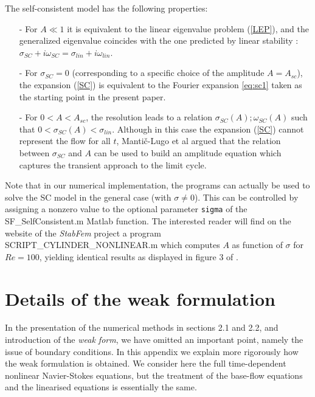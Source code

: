 \documentclass[twocolumn,10pt]{asme2ej}
\begin{document}
The self-consistent model has the following properties:
\begin{itemize}
\item[-] For $ A \ll 1$ it is equivalent to the linear eigenvalue problem (\ref{LEP}), and the generalized eigenvalue coincides with the one predicted by linear stability : $\sigma_{SC} + i \omega_{SC} = \sigma_{lin} + i \omega_{lin}$.
\item[-] For $\sigma_{SC}=0$ (corresponding to a specific choice of the amplitude $A=A_{sc}$),  the expansion (\ref{SC}) is equivalent to 
the Fourier expansion \ref{eq:sc1} taken as the starting point in the present paper. 
\item[-] For $0<A<A_{sc}$, the resolution leads to a relation $\sigma_{SC}(A) ; \omega_{SC}(A)$
such that $0< \sigma_{SC}(A) < \sigma_{lin}$.
 Although in this case the expansion ({\ref{SC}}) cannot represent the flow for all $t$, Manti\v{c}-Lugo et al \cite{MLugo2014} argued that the relation between $\sigma_{SC}$ and $A$ can be used to build an amplitude equation which captures the transient approach to the limit cycle. 
\end{itemize}

Note that in our numerical implementation, the programs can actually be used to solve the SC model in the general case (with $\sigma\ne0$). 
This can be controlled by assigning a nonzero value to the optional parameter \verb|sigma| of the  {\sf SF\_SelfConsistent.m} Matlab function. The interested reader will find on the website of the {\em StabFem} project a program {\sf SCRIPT\_CYLINDER\_NONLINEAR.m} which computes $A$ as function of $\sigma$ for $Re=100$, yielding identical results as displayed in figure 3 of \cite{MLugo2014}.

\section{Details of the weak formulation}

In the presentation of the numerical methods in sections 2.1 and 2.2, and introduction of the {\em weak form}, we have omitted an important point, namely the issue of boundary conditions. In this appendix we explain more rigorously how the weak formulation is obtained. We consider here the full time-dependent nonlinear Navier-Stokes equations, but the treatment of the base-flow equations and the linearised equations is essentially the same.
\end{document}
